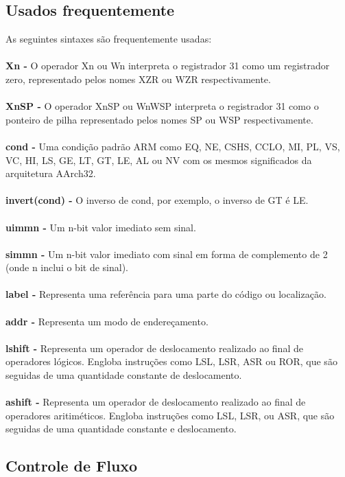 \documentclass[12pt,a4paper,utf8]{ppgsi}
\begin{document}
\subsection{Usados frequentemente}
As seguintes sintaxes são frequentemente usadas:
\\\\\textbf{Xn -} O operador Xn ou Wn interpreta o registrador 31 como um registrador zero, representado pelos nomes XZR ou WZR respectivamente.
\\\\\textbf{Xn\textbar SP -} O operador Xn\textbar SP ou Wn\textbar WSP interpreta o registrador 31 como o ponteiro de pilha representado pelos nomes SP ou WSP respectivamente.
\\\\\textbf{cond -} Uma condição padrão ARM como EQ, NE, CS\textbar HS, CC\textbar LO, MI, PL, VS, VC, HI, LS, GE, LT, GT, LE, AL ou NV com os mesmos significados da arquitetura AArch32.
\\\\\textbf{invert(cond) -} O inverso de cond, por exemplo, o inverso de GT é LE.
\\\\\textbf{uimmn -} Um n-bit valor imediato sem sinal.
\\\\\textbf{simmn -} Um n-bit valor imediato com sinal em forma de complemento de 2 (onde n inclui o bit de sinal).
\\\\\textbf{label -} Representa uma referência para uma parte do código ou localização.
\\\\\textbf{addr -} Representa um modo de endereçamento.
\\\\\textbf{lshift -} Representa um operador de deslocamento realizado ao final de operadores lógicos. Engloba instruções como LSL, LSR, ASR ou ROR, que são seguidas de uma quantidade constante de deslocamento.
\\\\\textbf{ashift -} Representa um operador de deslocamento realizado ao final de operadores aritiméticos. Engloba instruções como LSL, LSR, ou ASR, que são seguidas de uma quantidade constante e deslocamento.

\subsection{Controle de Fluxo}
\end{document}
